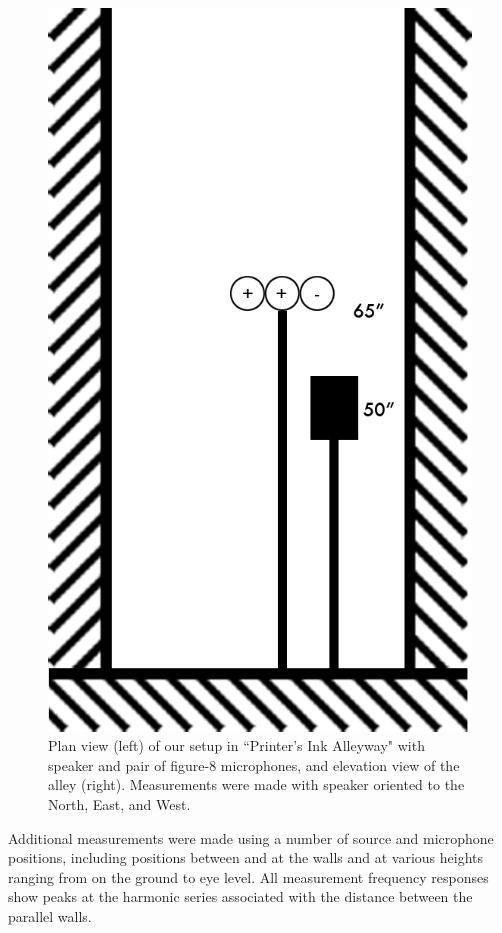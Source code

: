 \documentclass{aes137}
\begin{document}
\begin{figure}
\begin{minipage}[b]{0.41\linewidth}
\includegraphics[width=\textwidth]{images/alleyway_lookingdown.png}
\end{minipage}
\caption{Plan view (left) of our setup in ``Printer's Ink Alleyway" with speaker and pair of figure-8 microphones, and elevation view of the alley (right). Measurements were made with speaker oriented to the North, East, and West.}
\end{figure}

Additional measurements were made using a number of source and microphone positions, including positions between and at the walls and at various heights ranging from on the ground to eye level. All measurement frequency responses show peaks at the harmonic series associated with the distance between the parallel walls. 
\end{document}
